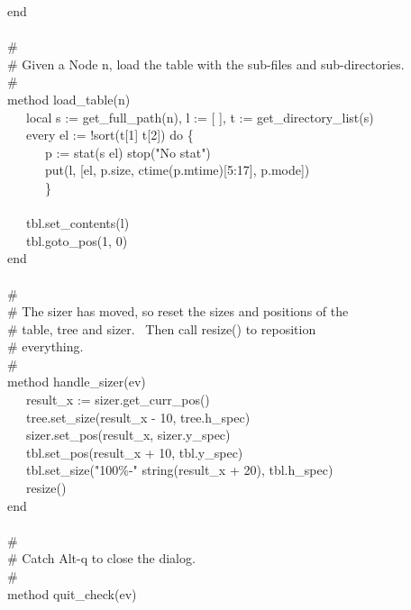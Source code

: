{\>   end \\
\ \\
\>   \# \\
\>   \# Given a Node n, load the table with the sub-files and sub-directories.\\
\>   \# \\
\>   method load\_table(n) \\
\>   \ \ \ local s := get\_full\_path(n), l := [ ], t := get\_directory\_list(s) \\
\>   \ \ \ every el := !sort(t[1] {\textbar}{\textbar}{\textbar} t[2])
do \{ \\
\>   \ \ \ \ \ \ p := stat(s {\textbar}{\textbar} el) {\textbar}
stop("No stat") \\
\>   \ \ \ \ \ \ put(l, [el, p.size, ctime(p.mtime)[5:17], p.mode]) \\
\>   \ \ \ \ \ \ \} \\
\ \\
\>   \ \ \ tbl.set\_contents(l) \\
\>   \ \ \ tbl.goto\_pos(1, 0) \\
\>   end \\
\ \\
\>   \# \\
\>   \# The sizer has moved, so reset the sizes and positions of the \\
\>   \# table, tree and sizer. \ Then call resize() to reposition \\
\>   \# everything. \\
\>   \# \\
\>   method handle\_sizer(ev) \\
\>   \ \ \ result\_x := sizer.get\_curr\_pos() \\
\>   \ \ \ tree.set\_size(result\_x - 10, tree.h\_spec) \\
\>   \ \ \ sizer.set\_pos(result\_x, sizer.y\_spec) \\
\>   \ \ \ tbl.set\_pos(result\_x + 10, tbl.y\_spec) \\
\>   \ \ \ tbl.set\_size("100\%-" {\textbar}{\textbar} string(result\_x + 20), tbl.h\_spec) \\
\>   \ \ \ resize() \\
\>   end \\
\ \\
\>   \# \\
\>   \# Catch Alt-q to close the dialog. \\
\>   \# \\
\>   method quit\_check(ev) \\
}
